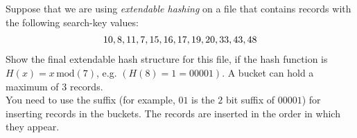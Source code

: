 


\question[5] Suppose that we are using \textit{extendable hashing} 
on a file that contains records with the following search-key values:
\begin{align}
  10, 8, 11, 7, 15, 16, 17, 19, 20, 33, 43, 48 \nonumber
\end{align}
Show the final extendable hash structure for this file, if the hash 
function is $H(x) = x\,\text{mod}(7)$, e.g. $(H(8) = 1 = 00001)$. A bucket
can hold a maximum of $3$ records. \\
You need to use the suffix (for example, $01$ is the $2$ bit suffix 
of $00001$) for inserting records in the buckets. The records are 
inserted in the order in which they appear.

\watchout

